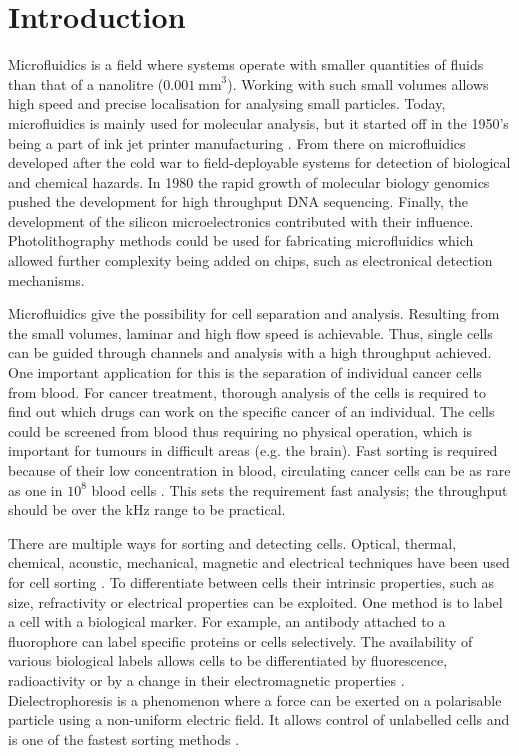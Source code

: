 \documentclass[final]{jyflluk}
\begin{document}
\section{Introduction}
\label{sec:introduction}

Microfluidics is a field where systems operate with smaller quantities of fluids than that of a nanolitre ($\SI{0.001}{\milli \metre}^3$). Working with such small volumes allows high speed and precise localisation for analysing small particles. Today, microfluidics is mainly used for molecular analysis, but it started off in the 1950’s being a part of ink jet printer manufacturing \cite{gervais_microfluidic_2011}. From there on microfluidics developed after the cold war to field-deployable systems for detection of biological and chemical hazards. In 1980 the rapid growth of molecular biology genomics pushed the development for high throughput DNA sequencing. Finally, the development of the silicon microelectronics contributed with their influence. Photolithography methods could be used for fabricating microfluidics which allowed further complexity being added on chips, such as electronical detection mechanisms. \cite{whitesides_origins_2006}

Microfluidics give the possibility for cell separation and analysis. Resulting from the small volumes, laminar and high flow speed is achievable. Thus, single cells can be guided through channels and analysis with a high throughput achieved. One important application for this is the separation of individual cancer cells from blood. For cancer treatment, thorough analysis of the cells is required to find out which drugs can work on the specific cancer of an individual. The cells could be screened from blood thus requiring no physical operation, which is important for tumours in difficult areas (e.g. the brain). Fast sorting is required because of their low concentration in blood, circulating cancer cells can be as rare as one in $10^8$ blood cells \cite{huang_enrichment_2013}. This sets the requirement fast analysis; the throughput should be over the kHz range to be practical. 

There are multiple ways for sorting and detecting cells. Optical, thermal, chemical, acoustic, mechanical, magnetic and electrical techniques have been used for cell sorting \cite{voldman_electrical_2006, ahn_dielectrophoretic_2006,zhang_towards_2015}. To differentiate between cells their intrinsic properties, such as size, refractivity or electrical properties can be exploited. One method is to label a cell with a biological marker.  For example, an antibody attached to a fluorophore can label specific proteins or cells selectively. The availability of various biological labels allows cells to be differentiated by fluorescence, radioactivity or by a change in their electromagnetic properties \cite{wilhelm_universal_2008}. Dielectrophoresis is a phenomenon where a force can be exerted on a polarisable particle using a non-uniform electric field. It allows control of unlabelled cells and is one of the fastest sorting methods \cite{zhang_towards_2015}.
\end{document}
